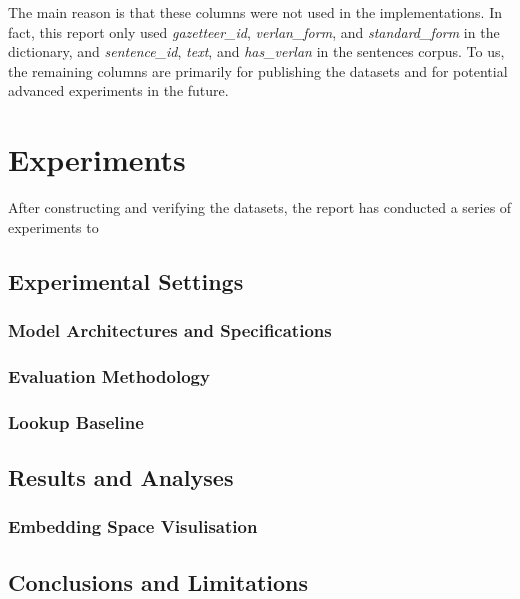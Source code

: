 \documentclass[12pt]{article}
\begin{document}
The main reason is that these columns were not used in the implementations. In fact, this report only used \textit{gazetteer\_id}, \textit{verlan\_form}, and \textit{standard\_form} in the dictionary, and \textit{sentence\_id}, \textit{text}, and \textit{has\_verlan} in the sentences corpus. To us, the remaining columns are primarily for publishing the datasets and for potential advanced experiments in the future.

\section{Experiments}

After constructing and verifying the datasets, the report has conducted a series of experiments to 

\subsection{Experimental Settings}
\subsubsection{Model Architectures and Specifications}
\subsubsection{Evaluation Methodology}
\subsubsection{Lookup Baseline}

\subsection{Results and Analyses}
\subsubsection{Embedding Space Visulisation}
\subsubsection{}
\subsubsection{}

\subsection{Conclusions and Limitations}
\end{document}
